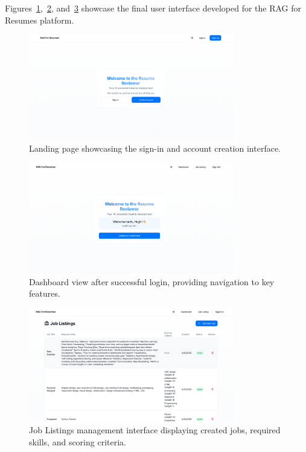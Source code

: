 \documentclass[12pt]{report}
\begin{document}
Figures~\ref{fig:landingpage},~\ref{fig:dashboard}, and~\ref{fig:joblisting} showcase the final user interface developed for the RAG for Resumes platform.

\begin{figure}[h]
    \centering
    \includegraphics[width=0.8\textwidth]{images/landing.png}
    \caption{Landing page showcasing the sign-in and account creation interface.}
    \label{fig:landingpage}
\end{figure}

\begin{figure}[h]
    \centering
    \includegraphics[width=0.8\textwidth]{images/welcome.png}
    \caption{Dashboard view after successful login, providing navigation to key features.}
    \label{fig:dashboard}
\end{figure}

\begin{figure}[h]
    \centering
    \includegraphics[width=0.8\textwidth]{images/list.png}
    \caption{Job Listings management interface displaying created jobs, required skills, and scoring criteria.}
    \label{fig:joblisting}
\end{figure}
\end{document}
